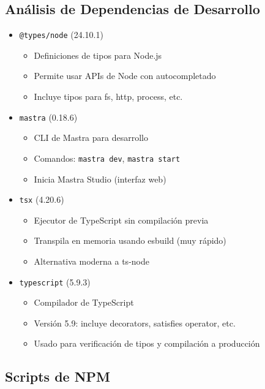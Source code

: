 \documentclass[12pt,a4paper]{article}
\begin{document}
\subsection{Análisis de Dependencias de Desarrollo}

\begin{itemize}
    \item \texttt{@types/node} (24.10.1)
    \begin{itemize}
        \item Definiciones de tipos para Node.js
        \item Permite usar APIs de Node con autocompletado
        \item Incluye tipos para fs, http, process, etc.
    \end{itemize}

    \item \texttt{mastra} (0.18.6)
    \begin{itemize}
        \item CLI de Mastra para desarrollo
        \item Comandos: \texttt{mastra dev}, \texttt{mastra start}
        \item Inicia Mastra Studio (interfaz web)
    \end{itemize}

    \item \texttt{tsx} (4.20.6)
    \begin{itemize}
        \item Ejecutor de TypeScript sin compilación previa
        \item Transpila en memoria usando esbuild (muy rápido)
        \item Alternativa moderna a ts-node
    \end{itemize}

    \item \texttt{typescript} (5.9.3)
    \begin{itemize}
        \item Compilador de TypeScript
        \item Versión 5.9: incluye decorators, satisfies operator, etc.
        \item Usado para verificación de tipos y compilación a producción
    \end{itemize}
\end{itemize}

\subsection{Scripts de NPM}
\end{document}
